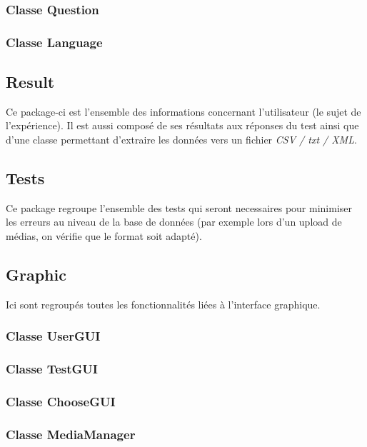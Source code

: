 \subsubsection{Classe Question}

\subsubsection{Classe Language}

\subsection{Result}

Ce package-ci est l'ensemble des informations concernant l'utilisateur (le sujet de l'expérience). Il est aussi composé de ses résultats aux réponses du test ainsi que d'une classe permettant d'extraire les données vers un fichier \textit{CSV / txt / XML}.

\subsection{Tests}

Ce package regroupe l'ensemble des tests qui seront necessaires pour minimiser les erreurs au niveau de la base de données (par exemple lors d'un upload de médias, on vérifie que le format soit adapté).

\subsection{Graphic}

Ici sont regroupés toutes les fonctionnalités liées à l'interface graphique.

\subsubsection{Classe UserGUI}

\subsubsection{Classe TestGUI}

\subsubsection{Classe ChooseGUI}

\subsubsection{Classe MediaManager}

